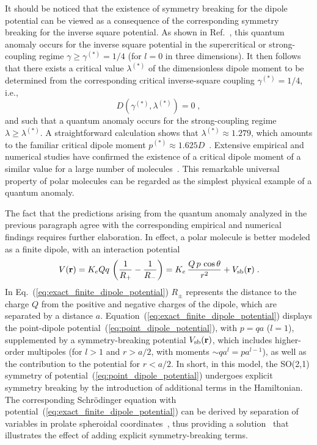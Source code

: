 \documentclass[a4paper,twocolumn,
showpacs,amssymb,aps,prl,superscriptaddress]{revtex4}%
\begin{document}
It should be noticed that the existence of symmetry breaking for
the dipole potential can be
viewed as a consequence of the corresponding symmetry breaking for
the inverse square potential.
As shown in Ref.~\cite{cam:00}, this quantum anomaly 
occurs for the inverse square potential in the supercritical
or strong-coupling regime $ \gamma \geq \gamma^{(*)}=1/4$
(for $l=0$ in three dimensions).
It then follows that there exists
a critical value $\lambda^{(*)}$
of the dimensionless dipole moment 
to be determined from the corresponding critical inverse-square coupling
$\gamma^{(*)}=1/4$, i.e.,
\begin{equation}
D(\gamma^{(*)},\lambda^{(*)}) =0 \; ,
\label{eq:critical_characteristic_equation}
\end{equation}
and such that a quantum anomaly occurs for 
the strong-coupling regime $ \lambda \geq \lambda^{(*)}$.
A straightforward calculation
shows that 
$\lambda^{(*)} \approx 1.279$,
which amounts to the familiar critical dipole moment $p^{(*)} \approx
1.625 D$~\cite{fer:47,wig:49,lev:67,bro:67,cra:67}. Extensive
empirical and numerical studies have confirmed the existence of a
critical dipole moment of a similar value for a large number of
molecules~\cite{mea:84,des:94}. This remarkable universal property
of polar molecules can be regarded as the simplest physical
example of a quantum anomaly.

The fact that the predictions arising from the quantum anomaly
analyzed in the previous paragraph agree with the corresponding
empirical and numerical findings requires further elaboration. In
effect, a polar molecule is better modeled as a finite dipole,
with an interaction potential
\begin{equation}
V({\bf r}) = K_{e} Qq \, \left( \frac{1}{R_{+}} - \frac{1}{R_{-}}
\right) =
 K_{e} \, \frac{ Q \, p \, \cos \theta}{r^{2}}
 +
 V_{\rm sb}({\bf r})
\;  .
\label{eq:exact_finite_dipole_potential}
\end{equation} 
In Eq.~(\ref{eq:exact_finite_dipole_potential})
$R_{\pm}$ represents the distance to the charge $Q$ from the positive
and negative charges of the dipole, which are separated by a distance $a$.
Equation~(\ref{eq:exact_finite_dipole_potential}) displays the
point-dipole potential~(\ref{eq:point_dipole_potential}), with
$p=qa$ ($l=1$), supplemented by a symmetry-breaking potential
$V_{\rm sb}({\bf r})$, which  includes higher-order multipoles
(for $l>1$ and $r>a/2$, with moments $\sim qa^{l}=p a^{l-1}$), as
well as the contribution to the potential for $r<a/2$. In short,
in this model, the SO(2,1) symmetry of
potential~(\ref{eq:point_dipole_potential}) undergoes explicit
symmetry breaking by the introduction of additional terms in the
Hamiltonian. The corresponding Schr\"{o}dinger equation with
potential~(\ref{eq:exact_finite_dipole_potential}) can be derived
by separation of variables in prolate spheroidal
coordinates~\cite{prolate}, thus providing a
solution~\cite{lev:67,bro:67,cra:67,finite_dipole} that
illustrates the effect of adding explicit symmetry-breaking terms.
\end{document}
